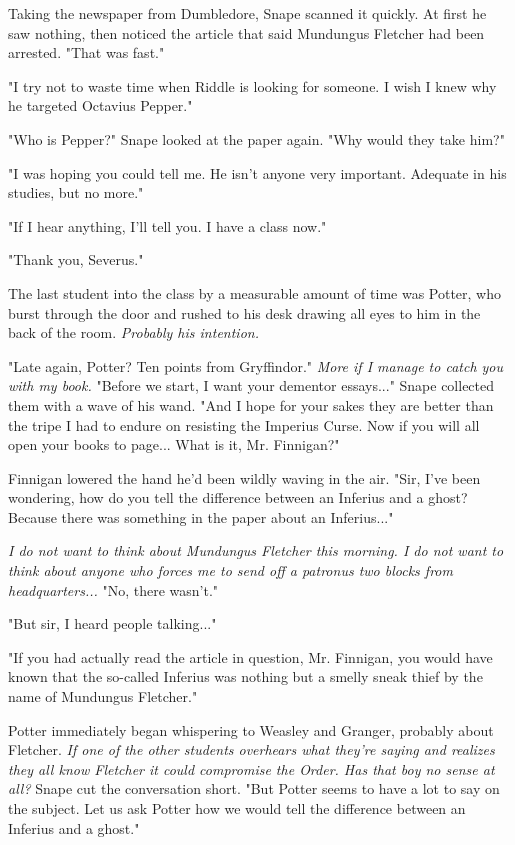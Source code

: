 \documentclass[a4paper,11pt]{article}
\begin{document}
Taking the newspaper from Dumbledore, Snape scanned it quickly. At first he saw nothing, then noticed the article that said Mundungus Fletcher had been arrested. "That was fast."

"I try not to waste time when Riddle is looking for someone. I wish I knew why he targeted Octavius Pepper."

"Who is Pepper?" Snape looked at the paper again. "Why would they take him?"

"I was hoping you could tell me. He isn't anyone very important. Adequate in his studies, but no more."

"If I hear anything, I'll tell you. I have a class now."

"Thank you, Severus."

The last student into the class by a measurable amount of time was Potter, who burst through the door and rushed to his desk drawing all eyes to him in the back of the room. \emph{Probably his intention.}

"Late again, Potter? Ten points from Gryffindor." \emph{More if I manage to catch you with my book.} "Before we start, I want your dementor essays..." Snape collected them with a wave of his wand. "And I hope for your sakes they are better than the tripe I had to endure on resisting the Imperius Curse. Now if you will all open your books to page... What is it, Mr. Finnigan?"

Finnigan lowered the hand he'd been wildly waving in the air. "Sir, I've been wondering, how do you tell the difference between an Inferius and a ghost? Because there was something in the paper about an Inferius..."

\emph{I do not want to think about Mundungus Fletcher this morning. I do not want to think about anyone who forces me to send off a patronus two blocks from headquarters...} "No, there wasn't."

"But sir, I heard people talking..."

"If you had actually read the article in question, Mr. Finnigan, you would have known that the so-called Inferius was nothing but a smelly sneak thief by the name of Mundungus Fletcher."

Potter immediately began whispering to Weasley and Granger, probably about Fletcher. \emph{If one of the other students overhears what they're saying and realizes they all know Fletcher it could compromise the Order. Has that boy no sense at all?} Snape cut the conversation short. "But Potter seems to have a lot to say on the subject. Let us ask Potter how we would tell the difference between an Inferius and a ghost."
\end{document}
